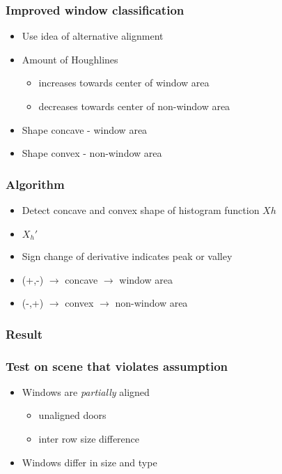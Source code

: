 \documentclass{beamer}
\begin{document}
\frame
{
	\frametitle{Improved window classification}
	\begin{itemize}
	\item <+-| alert@+> Use idea of alternative alignment
	\item <+-| alert@+> Amount of Houghlines 
		\begin{itemize}
		\item <+-| alert@+> increases towards center of window area
		\item <+-| alert@+> decreases towards center of non-window area
		\end{itemize}
	\item <+-| alert@+> Shape concave - window area
	\item <+-| alert@+> Shape convex - non-window area
	\end{itemize}
}
\frame
{
}

\frame
{
	\frametitle{Algorithm}
	\begin{itemize}
	\item <+-| alert@+> Detect concave and convex shape of histogram function $Xh$
	\item <+-| alert@+> $X_{h}'$ 
	\item <+-| alert@+> Sign change of derivative indicates peak or valley
	\item <+-| alert@+> (+,-) $\rightarrow$ concave $\rightarrow$ window area
	\item <+-| alert@+> (-,+) $\rightarrow$ convex $\rightarrow$ non-window area
	\end{itemize}
}

\frame
{
	\frametitle{Result}
}

\frame
{
	\frametitle{Test on scene that violates assumption}

	\begin{itemize}
		\item Windows are \emph{partially} aligned
			\begin{itemize}
			\item unaligned doors
			\item inter row size difference 
			\end{itemize}
		\item Windows differ in size and type
	\end{itemize}
}
\frame
{
}
\end{document}
